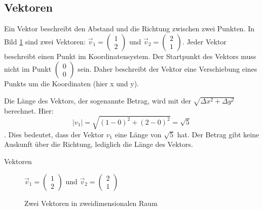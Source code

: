 \subsection{Vektoren}

Ein Vektor beschreibt den Abstand und die Richtung zwischen zwei Punkten. In Bild \ref{fig:ZweiVektoren} sind zwei Vektoren: $\vec{v}_1= \left(\begin{array}{c} 1 \\ 2 \end{array}\right)$ und  $\vec{v}_2= \left(\begin{array}{c} 2 \\ 1 \end{array}\right)$. Jeder Vektor beschreibt einen Punkt im Koordinatensystem. Der Startpunkt des Vektors muss nicht im Punkt $\left(\begin{array}{c}0\\0\end{array}\right)$ sein. Daher beschreibt der Vektor eine Verschiebung eines Punkts um die Koordinaten (hier x und y).

Die Länge des Vektors, der sogenannte Betrag, wird mit der $\sqrt{\Delta x^2 + \Delta y^2}$ berechnet. Hier: \[|v_1| = \sqrt{(1 - 0)^2 + (2 - 0)^2} = \sqrt{5}\]. Dies bedeutet, dass der Vektor $v_1$ eine Länge von $\sqrt{5}$ hat. Der Betrag gibt keine Auskunft über die Richtung, lediglich die Länge des Vektors.

\begin{frame}{Vektoren}
  \begin{figure}[htb]

    $\vec{v}_1= \left(\begin{array}{c} 1 \\ 2 \end{array}\right)$ und  $\vec{v}_2= \left(\begin{array}{c} 2 \\ 1 \end{array}\right)$
    \caption{Zwei Vektoren in zweidimensionalen Raum}
    \label{fig:ZweiVektoren}
  \end{figure}
\end{frame}

